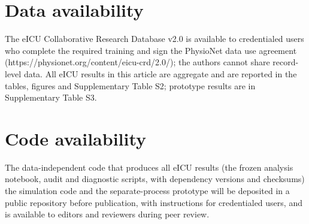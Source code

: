 \documentclass[11pt]{article}
\begin{document}
\section*{Data availability}
The eICU Collaborative Research Database v2.0 is available to credentialed users who complete the required training and sign the PhysioNet data use agreement (https://physionet.org/content/eicu-crd/2.0/); the authors cannot share record-level data. All eICU results in this article are aggregate and are reported in the tables, figures and Supplementary Table S2; prototype results are in Supplementary Table S3.

\section*{Code availability}
The data-independent code that produces all eICU results (the frozen analysis notebook, audit and diagnostic scripts, with dependency versions and checksums) the simulation code and the separate-process prototype will be deposited in a public repository before publication, with instructions for credentialed users, and is available to editors and reviewers during peer review.
\end{document}
